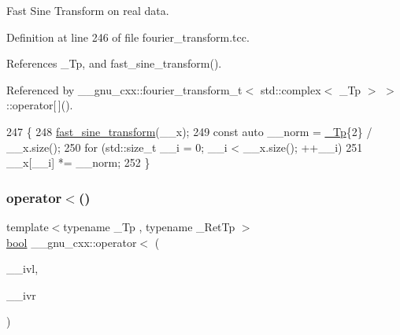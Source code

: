 Fast Sine Transform on real data. 

Definition at line 246 of file fourier\+\_\+transform.\+tcc.



References \+\_\+\+Tp, and fast\+\_\+sine\+\_\+transform().



Referenced by \+\_\+\+\_\+gnu\+\_\+cxx\+::fourier\+\_\+transform\+\_\+t$<$ std\+::complex$<$ \+\_\+\+Tp $>$ $>$\+::operator\mbox{[}$\,$\mbox{]}().


\begin{DoxyCode}
247     \{
248       \hyperlink{namespace____gnu__cxx_a97f96274ac4998cf6a7c37fcb48c9bff}{fast\_sine\_transform}(\_\_x);
249       \textcolor{keyword}{const} \textcolor{keyword}{auto} \_\_norm = \hyperlink{namespace____gnu__cxx_a3b19a9c800ca194374ef9172290f7d79}{\_Tp}\{2\} / \_\_x.size();
250       \textcolor{keywordflow}{for} (std::size\_t \_\_i = 0; \_\_i < \_\_x.size(); ++\_\_i)
251         \_\_x[\_\_i] *= \_\_norm;
252     \}
\end{DoxyCode}
\mbox{\label{namespace____gnu__cxx_ac78e93e1aaf9f0948027570a303c7846}} 
\subsubsection{\texorpdfstring{operator$<$()}{operator<()}}
{\footnotesize\ttfamily template$<$typename \+\_\+\+Tp , typename \+\_\+\+Ret\+Tp $>$ \\
\hyperlink{namespace____gnu__cxx_ae83aca57f97767d5d09188718728a0ac}{bool} \+\_\+\+\_\+gnu\+\_\+cxx\+::operator$<$ (\begin{DoxyParamCaption}\item[{const \hyperlink{struct____gnu__cxx_1_1cquad__interval}{cquad\+\_\+interval}$<$ \hyperlink{namespace____gnu__cxx_a3b19a9c800ca194374ef9172290f7d79}{\+\_\+\+Tp}, \hyperlink{namespace____gnu__cxx_a886e03ece3d53ff7fa6c098a40f93fa5}{\+\_\+\+Ret\+Tp} $>$ \&}]{\+\_\+\+\_\+ivl,  }\item[{const \hyperlink{struct____gnu__cxx_1_1cquad__interval}{cquad\+\_\+interval}$<$ \hyperlink{namespace____gnu__cxx_a3b19a9c800ca194374ef9172290f7d79}{\+\_\+\+Tp}, \hyperlink{namespace____gnu__cxx_a886e03ece3d53ff7fa6c098a40f93fa5}{\+\_\+\+Ret\+Tp} $>$ \&}]{\+\_\+\+\_\+ivr }\end{DoxyParamCaption})}

